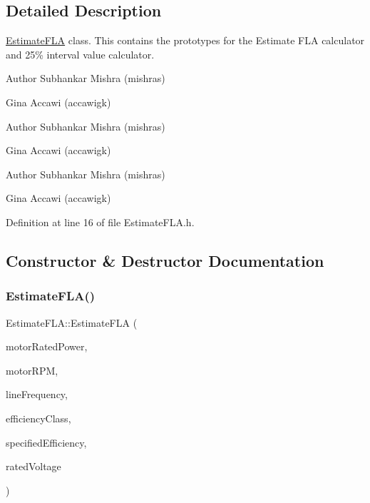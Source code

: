 \subsection{Detailed Description}
\hyperlink{class_estimate_f_l_a}{Estimate\+F\+LA} class. This contains the prototypes for the Estimate F\+LA calculator and 25\% interval value calculator. 

\begin{DoxyAuthor}{Author}
Subhankar Mishra (mishras) 

Gina Accawi (accawigk) 
\end{DoxyAuthor}


\begin{DoxyAuthor}{Author}
Subhankar Mishra (mishras) 

Gina Accawi (accawigk) 
\end{DoxyAuthor}


\begin{DoxyAuthor}{Author}
Subhankar Mishra (mishras) 

Gina Accawi (accawigk) 
\end{DoxyAuthor}


Definition at line 16 of file Estimate\+F\+L\+A.\+h.



\subsection{Constructor \& Destructor Documentation}
\mbox{\label{class_estimate_f_l_a_ace098c4a684eb4926b20322cf65da32d}} 
\subsubsection{\texorpdfstring{Estimate\+F\+L\+A()}{EstimateFLA()}\hspace{0.1cm}{\footnotesize\ttfamily [1/3]}}
{\footnotesize\ttfamily Estimate\+F\+L\+A\+::\+Estimate\+F\+LA (\begin{DoxyParamCaption}\item[{double}]{motor\+Rated\+Power,  }\item[{double}]{motor\+R\+PM,  }\item[{\hyperlink{class_motor_acee1bdf1b684ad36cb80dc2829d9fcee}{Motor\+::\+Line\+Frequency}}]{line\+Frequency,  }\item[{\hyperlink{class_motor_afa022971ae062406a9f588c601673d4e}{Motor\+::\+Efficiency\+Class}}]{efficiency\+Class,  }\item[{double}]{specified\+Efficiency,  }\item[{double}]{rated\+Voltage }\end{DoxyParamCaption})\hspace{0.3cm}{\ttfamily [inline]}}

